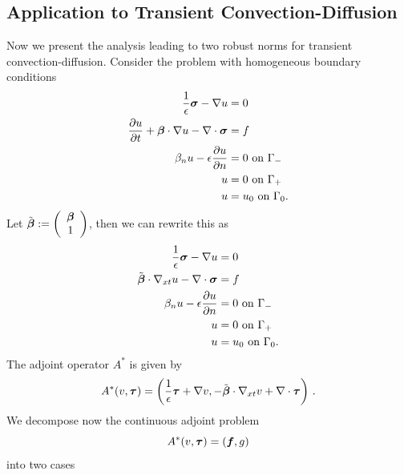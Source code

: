 \documentclass{article}
\theoremstyle{definition}
\theoremstyle{remark}
\begin{document}
\subsection{Application to Transient Convection-Diffusion}
Now we present the analysis leading to two robust norms for transient convection-diffusion.
Consider the problem with homogeneous boundary conditions
\begin{align*}
\frac{1}{\epsilon}\boldsymbol\sigma-\nabla u &=0\\
\frac{\partial u}{\partial t} + \boldsymbol\beta\cdot\nabla u - \nabla\cdot\boldsymbol\sigma &= f\\
\beta_n u-\epsilon\frac{\partial u}{\partial n} &= 0 \text{ on } \Gamma_-\\
u &= 0 \text{ on } \Gamma_+\\
u &= u_0 \text{ on } \Gamma_0.
\end{align*}
Let $\tilde{\boldsymbol\beta}:=\left( \begin{array}{c} \boldsymbol\beta\\ 1\\ \end{array} \right)$, then we can rewrite this as
\begin{align*}
\frac{1}{\epsilon}\boldsymbol\sigma-\nabla u &=0\\
\tilde{\boldsymbol\beta}\cdot\nabla_{xt} u - \nabla\cdot\boldsymbol\sigma &= f\\
\beta_n u-\epsilon\frac{\partial u}{\partial n} &= 0 \text{ on } \Gamma_-\\
u &= 0 \text{ on } \Gamma_+\\
u &= u_0 \text{ on } \Gamma_0.
\end{align*}
The adjoint operator $A^*$ is given by 
\[
A^*(v,\boldsymbol\tau)=\left( \frac{1}{\epsilon}\boldsymbol\tau+\nabla v,-\tilde{\boldsymbol\beta}\cdot\nabla_{xt} v+\nabla\cdot\boldsymbol\tau \right)\,.
\]
We decompose now the continuous adjoint problem
\[
A^*(v,\boldsymbol\tau)=(\boldsymbol f,g)
\]
into two cases
\end{document}
